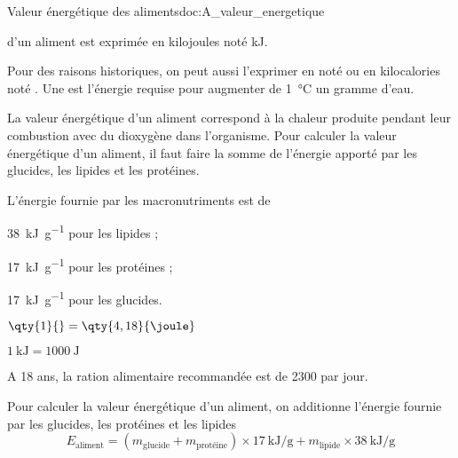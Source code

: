 \newpage
\vspace*{-36pt}
\begin{doc}{Valeur énergétique des aliments}{doc:A_valeur_energetique}
  \begin{importants}  
     d'un aliment est exprimée en kilojoules noté \unit{\kilo\joule}.
  \end{importants}
  Pour des raisons historiques, on peut aussi l'exprimer en  noté \unit{\cal} ou en kilocalories noté \unit{\kcal}.
  Une  est l'énergie requise pour augmenter de \qty{1}{\degreeCelsius} un gramme d'eau.

  La valeur énergétique d'un aliment correspond à la chaleur produite pendant leur combustion avec du dioxygène dans l'organisme.
  Pour calculer la valeur énergétique d'un aliment, il faut faire la somme de l'énergie apporté par les glucides, les lipides et les protéines.
  
  \begin{importants}
    L'énergie fournie par les macronutriments est de
    \begin{listePoints}[2]
      \item \qty{38}{\kilo\joule\per\g} pour les lipides ;
      \item \qty{17}{\kilo\joule\per\g} pour les protéines ;
      \item \qty{17}{\kilo\joule\per\g} pour les glucides.
    \end{listePoints}
  \end{importants}

  \begin{donnees}[2]
    \item $\qty{1}{\cal} = \qty{4,18}{\joule}$
    \item $\qty{1}{\kilo\joule} = \qty{1000}{\joule}$
    \item A 18 ans, la ration alimentaire recommandée est de \qty{2300}{\kcal} par jour.
  \end{donnees}
 
  Pour calculer la valeur énergétique d'un aliment, on additionne l'énergie fournie par les glucides, les protéines et les lipides
  \begin{equation*}
    E_\text{aliment} 
    = (m_\text{glucide} + m_\text{protéine}) \times \qty{17}{\kilo\joule\per\g}
    +  m_\text{lipide} \times \qty{38}{\kilo\joule\per\g}
  \end{equation*}
\end{doc}

